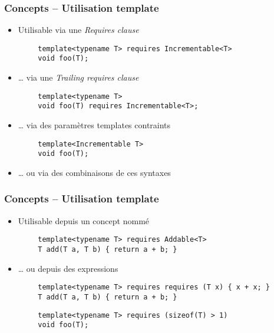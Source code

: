 \documentclass[C++.tex]{subfiles}
\begin{document}
\begin{frame}[fragile]
	\frametitle{Concepts -- Utilisation template}
	\begin{itemize}
		\item Utilisable via une \textit{Requires clause}
	\end{itemize}

	\begin{verbatim}
		template<typename T> requires Incrementable<T>
		void foo(T);
	\end{verbatim}

	\begin{itemize}
		\item \ldots{} via une \textit{Trailing requires clause}
	\end{itemize}

	\begin{verbatim}
		template<typename T>
		void foo(T) requires Incrementable<T>;
	\end{verbatim}

	\begin{itemize}
		\item \ldots{} via des paramètres templates contraints
	\end{itemize}

	\begin{verbatim}
		template<Incrementable T>
		void foo(T);
	\end{verbatim}

	\begin{itemize}
		\item \ldots{} ou via des combinaisons de ces syntaxes
	\end{itemize}
\end{frame}

\begin{frame}[fragile]
	\frametitle{Concepts -- Utilisation template}
	\begin{itemize}
		\item Utilisable depuis un concept nommé
	\end{itemize}

	\begin{verbatim}
		template<typename T> requires Addable<T>
		T add(T a, T b) { return a + b; }
	\end{verbatim}

	\begin{itemize}
		\item \ldots{} ou depuis des expressions
	\end{itemize}
 
	\begin{verbatim}
		template<typename T> requires requires (T x) { x + x; }
		T add(T a, T b) { return a + b; }
	\end{verbatim}

	\begin{verbatim}
		template<typename T> requires (sizeof(T) > 1)
		void foo(T);
	\end{verbatim}

\end{frame}
\end{document}
